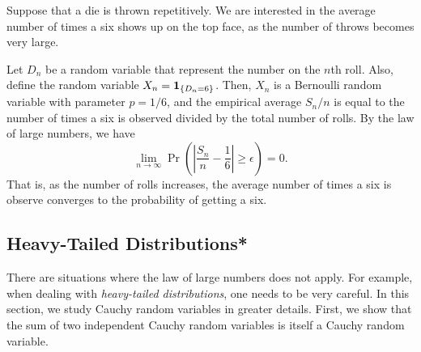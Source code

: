 \begin{example}
Suppose that a die is thrown repetitively.
We are interested in the average number of times a six shows up on the top face, as the number of throws becomes very large.

Let $D_n$ be a random variable that represent the number on the $n$th roll.
Also, define the random variable $X_n = \mathbf{1}_{\{ D_n = 6 \}}$.
Then, $X_n$ is a Bernoulli random variable with parameter $p = 1/6$, and the empirical average $S_n / n$ is equal to the number of times a six is observed divided by the total number of rolls.
By the law of large numbers, we have
\begin{equation*}
\lim_{n \rightarrow \infty}
\Pr \left( \left| \frac{S_n}{n} - \frac{1}{6} \right| \geq \epsilon \right) = 0 .
\end{equation*}
That is, as the number of rolls increases, the average number of times a six is observe converges to the probability of getting a six.
\end{example}


\subsection{Heavy-Tailed Distributions*}

There are situations where the law of large numbers does not apply.
For example, when dealing with \emph{heavy-tailed distributions}, one needs to be very careful.
In this section, we study Cauchy random variables in greater details.
First, we show that the sum of two independent Cauchy random variables is itself a Cauchy random variable.

